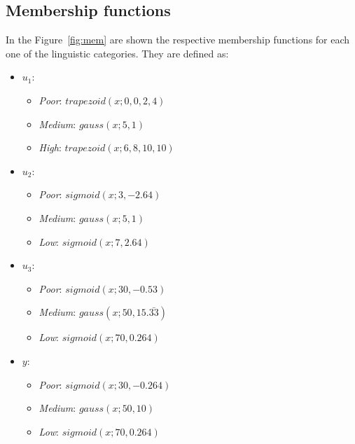 \documentclass[conference]{IEEEtran}
\begin{document}
\subsection{Membership functions}
In the Figure~\ref{fig:mem} are shown the respective membership functions for each one of the linguistic categories. They are defined as:
\begin{itemize}
    \item $u_1$:
    \begin{itemize}
        \item \textit{Poor}: $trapezoid(x;0,0,2,4)$
        \item \textit{Medium}: $gauss(x;5,1)$
        \item \textit{High}: $trapezoid(x;6,8,10,10)$
    \end{itemize}
    \item $u_2$:
    \begin{itemize}
        \item \textit{Poor}: $sigmoid(x;3,-2.64)$
        \item \textit{Medium}: $gauss(x;5,1)$
        \item \textit{Low}: $sigmoid(x;7,2.64)$
    \end{itemize}
    \item $u_3$:
    \begin{itemize}
        \item \textit{Poor}: $sigmoid(x;30,-0.53)$
        \item \textit{Medium}: $gauss(x;50,15.\bar{33})$
        \item \textit{Low}: $sigmoid(x;70,0.264)$
    \end{itemize}
    \item $y$:
    \begin{itemize}
        \item \textit{Poor}: $sigmoid(x;30,-0.264)$
        \item \textit{Medium}: $gauss(x;50,10)$
        \item \textit{Low}: $sigmoid(x;70,0.264)$
    \end{itemize}
\end{itemize}
\end{document}
